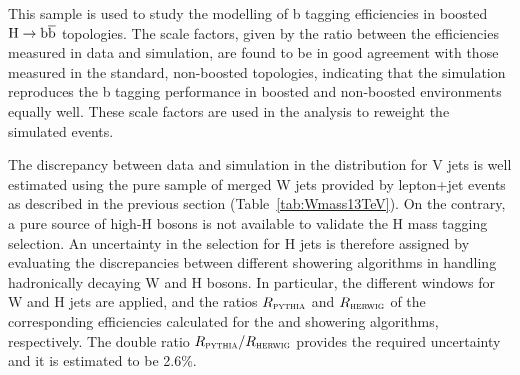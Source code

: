 This sample is used to study the modelling of b tagging efficiencies in boosted $\mathrm{H}\to{\mathrm{b}\overline{\mathrm{b}}}$ topologies.
The scale factors, given by the ratio between the efficiencies measured in data and simulation, are
found to be in good agreement with those measured in the standard, non-boosted topologies,
indicating that the simulation reproduces the b tagging performance in boosted and non-boosted environments equally well.
These scale factors are used in the analysis to reweight the simulated events.

The discrepancy between data and simulation in the \mJ distribution for V jets is well estimated 
using the pure sample of merged W jets provided by lepton+jet \ttbar events as described in the previous section (Table~\ref{tab:Wmass13TeV}).
On the contrary, a pure source of high-\pt H bosons is not available to validate the H mass tagging selection.
An uncertainty in the \mJ selection for H jets is therefore assigned by evaluating the discrepancies
between different showering algorithms in handling hadronically decaying W and H bosons.
In particular, the different \mJ windows for W and H jets are applied,
and the ratios $R_{\textsc{pythia}}{}$ and $R_{\textsc{herwig}}{}$ of the corresponding efficiencies calculated for the \PYTHIA{} and \HERWIG{} showering algorithms, respectively.
The double ratio $R_{\textsc{pythia}}{}/R_{\textsc{herwig}}{}$ provides the required uncertainty and it is estimated to be 2.6\%.

